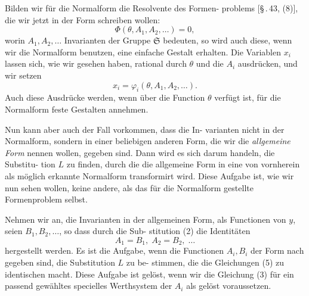 \documentclass[12pt,a4paper]{article}
\theoremstyle{plain}
\theoremstyle{definition}
\theoremstyle{remark}
\begin{document}
Bilden wir f\"ur die Normalform die Resolvente des Formen-
problems [\S\,.\,43, (8)], die wir jetzt in der Form schreiben wollen:
\begin{equation}\label{eq:47_3}
\Phi(\theta, A_1, A_2, \ldots) = 0,\tag{3}
\end{equation}
worin $A_1, A_2, \ldots$ Invarianten der Gruppe $\mathfrak{S}$ bedeuten, so wird
auch diese, wenn wir die Normalform benutzen, eine einfache
Gestalt erhalten. Die Variablen $x_i$ lassen sich, wie wir gesehen
haben, rational durch $\theta$ und die $A_i$ ausdr\"ucken, und wir setzen
\begin{equation}\label{eq:47_4}
x_i = \varphi_i(\theta, A_1, A_2, \ldots).\tag{4}
\end{equation}
Auch diese Ausdr\"ucke werden, wenn \"uber die Function $\theta$
verf\"ugt ist, f\"ur die Normalform feste Gestalten annehmen.

Nun kann aber auch der Fall vorkommen, dass die In-
varianten nicht in der Normalform, sondern in einer beliebigen
anderen Form, die wir die \emph{allgemeine Form} nennen wollen,
gegeben sind. Dann wird es sich darum handeln, die Substitu-
tion $L$ zu finden, durch die die allgemeine Form in eine von
vornherein als m\"oglich erkannte Normalform transformirt wird.
Diese Aufgabe ist, wie wir nun sehen wollen, keine andere, als
das f\"ur die Normalform gestellte Formenproblem selbst.

Nehmen wir an, die Invarianten in der allgemeinen Form,
als Functionen von $y$, seien $B_1, B_2, \ldots$, so dass durch die Sub-
stitution (2) die Identit\"aten
\begin{equation}\label{eq:47_5}
A_1 = B_1,\; A_2 = B_2,\; \ldots\tag{5}
\end{equation}
hergestellt werden. Es ist die Aufgabe, wenn die Functionen
$A_i, B_i$ der Form nach gegeben sind, die Substitution $L$ zu be-
stimmen, die die Gleichungen (5) zu identischen macht. Diese
Aufgabe ist gel\"ost, wenn wir die Gleichung (3) f\"ur ein passend
gew\"ahltes specielles Werthsystem der $A_i$ als gel\"ost voraussetzen.
\end{document}
